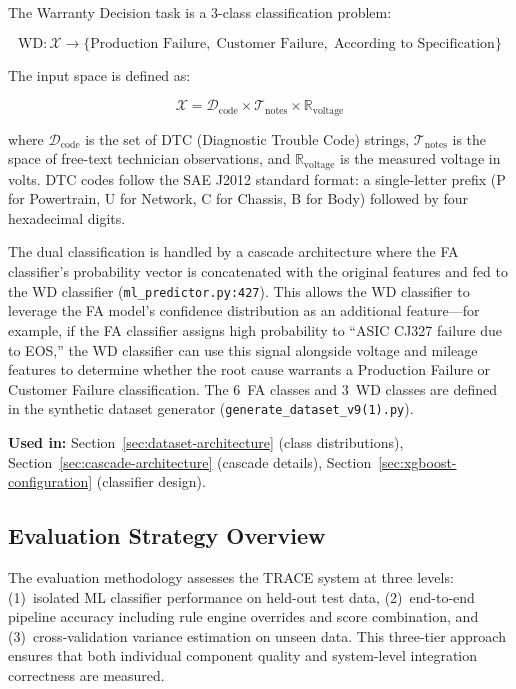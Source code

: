 \documentclass[10pt,a4paper]{article}
\begin{document}
The Warranty Decision task is a 3-class classification problem:

\begin{equation}
\text{WD}\colon \mathcal{X} \to \{\text{Production Failure},\; \text{Customer Failure},\; \text{According to Specification}\}
\label{eq:wd-mapping}
\end{equation}

The input space is defined as:

\begin{equation}
\mathcal{X} = \mathcal{D}_{\text{code}} \times \mathcal{T}_{\text{notes}} \times \mathbb{R}_{\text{voltage}}
\label{eq:input-space}
\end{equation}

where $\mathcal{D}_{\text{code}}$ is the set of DTC (Diagnostic Trouble Code) strings, $\mathcal{T}_{\text{notes}}$ is the space of free-text technician observations, and $\mathbb{R}_{\text{voltage}}$ is the measured voltage in volts. DTC codes follow the SAE J2012 standard format: a single-letter prefix (P for Powertrain, U for Network, C for Chassis, B for Body) followed by four hexadecimal digits.

The dual classification is handled by a cascade architecture where the FA classifier's probability vector is concatenated with the original features and fed to the WD classifier (\texttt{ml\_predictor.py:427}). This allows the WD classifier to leverage the FA model's confidence distribution as an additional feature---for example, if the FA classifier assigns high probability to ``ASIC CJ327 failure due to EOS,'' the WD classifier can use this signal alongside voltage and mileage features to determine whether the root cause warrants a Production Failure or Customer Failure classification. The 6~FA classes and 3~WD classes are defined in the synthetic dataset generator (\texttt{generate\_dataset\_v9(1).py}).

\textbf{Used in:} Section~\ref{sec:dataset-architecture} (class distributions), Section~\ref{sec:cascade-architecture} (cascade details), Section~\ref{sec:xgboost-configuration} (classifier design).

\subsection{Evaluation Strategy Overview}
\label{sec:evaluation-strategy-overview}

The evaluation methodology assesses the TRACE system at three levels: (1)~isolated ML classifier performance on held-out test data, (2)~end-to-end pipeline accuracy including rule engine overrides and score combination, and (3)~cross-validation variance estimation on unseen data. This three-tier approach ensures that both individual component quality and system-level integration correctness are measured.
\end{document}
